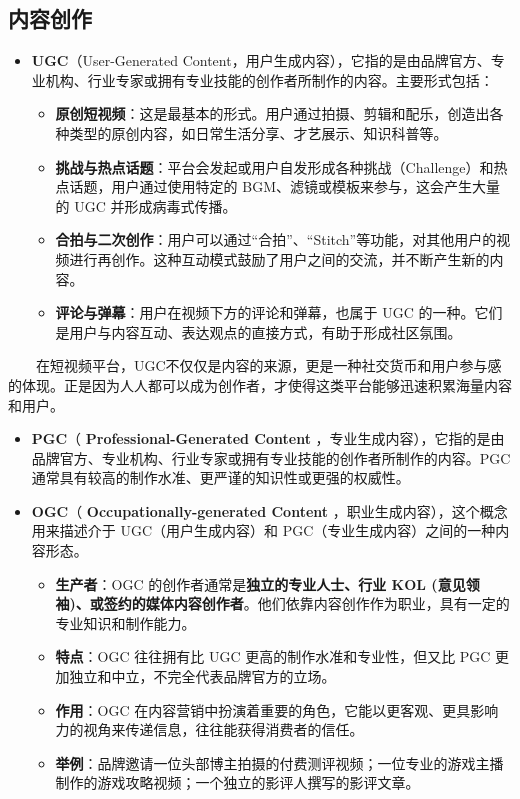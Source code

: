 \documentclass[
  letterpaper,
  DIV=11,
  numbers=noendperiod]{scrreprt}
\providecommand{\tightlist}{%
  \setlength{\itemsep}{0pt}\setlength{\parskip}{0pt}}
\begin{document}
\subsection{内容创作}\label{ux5185ux5bb9ux521bux4f5c}

\begin{itemize}
\tightlist
\item
  \textbf{UGC}（User-Generated
  Content，用户生成内容），它指的是由品牌官方、专业机构、行业专家或拥有专业技能的创作者所制作的内容。主要形式包括：

  \begin{itemize}
  \item
    \textbf{原创短视频}：这是最基本的形式。用户通过拍摄、剪辑和配乐，创造出各种类型的原创内容，如日常生活分享、才艺展示、知识科普等。
  \item
    \textbf{挑战与热点话题}：平台会发起或用户自发形成各种挑战（Challenge）和热点话题，用户通过使用特定的
    BGM、滤镜或模板来参与，这会产生大量的 UGC 并形成病毒式传播。
  \item
    \textbf{合拍与二次创作}：用户可以通过``合拍''、``Stitch''等功能，对其他用户的视频进行再创作。这种互动模式鼓励了用户之间的交流，并不断产生新的内容。
  \item
    \textbf{评论与弹幕}：用户在视频下方的评论和弹幕，也属于 UGC
    的一种。它们是用户与内容互动、表达观点的直接方式，有助于形成社区氛围。
  \end{itemize}
\end{itemize}

  在短视频平台，UGC不仅仅是内容的来源，更是一种社交货币和用户参与感的体现。正是因为人人都可以成为创作者，才使得这类平台能够迅速积累海量内容和用户。

\begin{itemize}
\tightlist
\item
  \textbf{PGC}（ \textbf{Professional-Generated Content}
  ，专业生成内容），它指的是由品牌官方、专业机构、行业专家或拥有专业技能的创作者所制作的内容。PGC通常具有较高的制作水准、更严谨的知识性或更强的权威性。
\item
  \textbf{OGC}（ \textbf{Occupationally-generated Content}
  ，职业生成内容），这个概念用来描述介于 UGC（用户生成内容）和
  PGC（专业生成内容）之间的一种内容形态。

  \begin{itemize}
  \item
    \textbf{生产者}：OGC 的创作者通常是\textbf{独立的专业人士、行业 KOL
    (意见领袖)、或签约的媒体内容创作者}。他们依靠内容创作作为职业，具有一定的专业知识和制作能力。
  \item
    \textbf{特点}：OGC 往往拥有比 UGC 更高的制作水准和专业性，但又比 PGC
    更加独立和中立，不完全代表品牌官方的立场。
  \item
    \textbf{作用}：OGC
    在内容营销中扮演着重要的角色，它能以更客观、更具影响力的视角来传递信息，往往能获得消费者的信任。
  \item
    \textbf{举例}：品牌邀请一位头部博主拍摄的付费测评视频；一位专业的游戏主播制作的游戏攻略视频；一个独立的影评人撰写的影评文章。
  \end{itemize}
\end{itemize}
\end{document}
